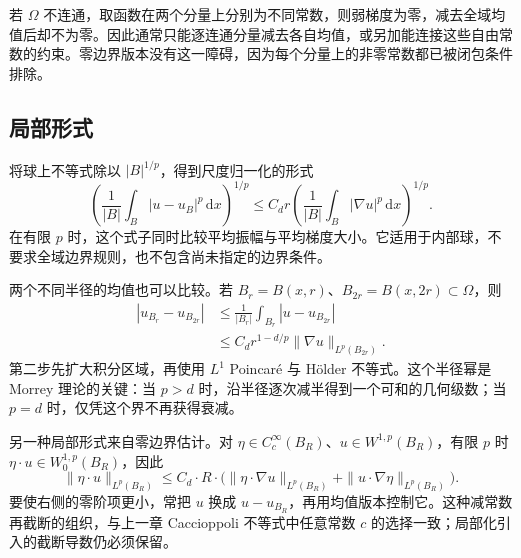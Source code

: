 \ProseParagraphBreak

若 \(\Omega\) 不连通，取函数在两个分量上分别为不同常数，则弱梯度为零，减去全域均值后却不为零。因此通常只能逐连通分量减去各自均值，或另加能连接这些自由常数的约束。零边界版本没有这一障碍，因为每个分量上的非零常数都已被闭包条件排除。

\subsection{局部形式}
\label{b1:subsec:240104}

将球上不等式除以 \(|B|^{1/p}\)，得到尺度归一化的形式
\begin{equation}\label{b1:eq:poincare-average-form}
 \left(\frac1{|B|}\int_B|u-u_B|^p\,\mathrm dx\right)^{1/p}
 \le C_dr
       \left(\frac1{|B|}\int_B|\nabla u|^p\,\mathrm dx\right)^{1/p}.
\end{equation}
在有限 \(p\) 时，这个式子同时比较平均振幅与平均梯度大小。它适用于内部球，不要求全域边界规则，也不包含尚未指定的边界条件。

\ProseParagraphBreak

两个不同半径的均值也可以比较。若 \(B_r=B(x,r)\)、\(B_{2r}=B(x,2r)\subset\Omega\)，则
\[
 \begin{aligned}
 |u_{B_r}-u_{B_{2r}}|
 &\le \frac1{|B_r|}\int_{B_r}|u-u_{B_{2r}}|\\
 &\le C_d r^{1-d/p}\|\nabla u\|_{L^p(B_{2r})}.
 \end{aligned}
\]
第二步先扩大积分区域，再使用 \(L^1\) Poincaré 与 Hölder 不等式。这个半径幂是 Morrey 理论的关键：当 \(p>d\) 时，沿半径逐次减半得到一个可和的几何级数；当 \(p=d\) 时，仅凭这个界不再获得衰减。

\ProseParagraphBreak

另一种局部形式来自零边界估计。对 \(\eta\in C_c^\infty(B_R)\)、\(u\in W^{1,p}(B_R)\)，有限 \(p\) 时 \(\eta\cdot u\in W_0^{1,p}(B_R)\)，因此
\[
 \|\eta\cdot u\|_{L^p(B_R)}
 \le C_d\cdot R\cdot\bigl(\|\eta\cdot\nabla u\|_{L^p(B_R)}
                   +\|u\cdot\nabla\eta\|_{L^p(B_R)}\bigr).
\]
要使右侧的零阶项更小，常把 \(u\) 换成 \(u-u_{B_R}\)，再用均值版本控制它。这种减常数再截断的组织，与上一章 Caccioppoli 不等式中任意常数 \(c\) 的选择一致；局部化引入的截断导数仍必须保留。
